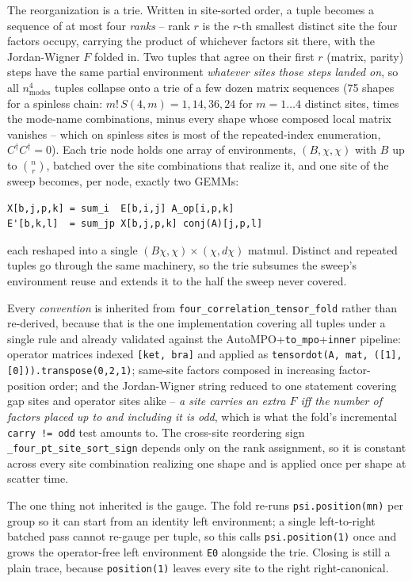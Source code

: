 \documentclass[11pt]{article}
\begin{document}
The reorganization is a trie. Written in site-sorted order, a tuple becomes a
sequence of at most four \emph{ranks} -- rank $r$ is the $r$-th smallest
distinct site the four factors occupy, carrying the product of whichever
factors sit there, with the Jordan-Wigner $F$ folded in. Two tuples that
agree on their first $r$ (matrix, parity) steps have the same partial
environment \emph{whatever sites those steps landed on}, so all
$n_\mathrm{modes}^4$ tuples collapse onto a trie of a few dozen matrix
sequences (75 shapes for a spinless chain: $m!\,S(4,m) = 1, 14, 36, 24$ for
$m = 1\ldots4$ distinct sites, times the mode-name combinations, minus every
shape whose composed local matrix vanishes -- which on spinless sites is most
of the repeated-index enumeration, $C^\dagger C^\dagger = 0$). Each trie node
holds one array of environments, $(B,\chi,\chi)$ with $B$ up to $\binom{n}{r}$,
batched over the site combinations that realize it, and one site of the sweep
becomes, per node, exactly two GEMMs:
%
\begin{verbatim}
X[b,j,p,k] = sum_i  E[b,i,j] A_op[i,p,k]
E'[b,k,l]  = sum_jp X[b,j,p,k] conj(A)[j,p,l]
\end{verbatim}
%
each reshaped into a single $(B\chi,\chi)\times(\chi,d\chi)$ matmul. Distinct
and repeated tuples go through the same machinery, so the trie subsumes the
sweep's environment reuse and extends it to the half the sweep never covered.

Every \emph{convention} is inherited from
\texttt{four\_correlation\_tensor\_fold} rather than re-derived, because that
is the one implementation covering all tuples under a single rule and already
validated against the AutoMPO+\texttt{to\_mpo}+\texttt{inner} pipeline:
operator matrices indexed \texttt{[ket, bra]} and applied as
\texttt{tensordot(A, mat, ([1],[0])).transpose(0,2,1)}; same-site factors
composed in increasing factor-position order; and the Jordan-Wigner string
reduced to one statement covering gap sites and operator sites alike --
\emph{a site carries an extra $F$ iff the number of factors placed up to and
including it is odd}, which is what the fold's incremental
\texttt{carry != odd} test amounts to. The cross-site reordering sign
\texttt{\_four\_pt\_site\_sort\_sign} depends only on the rank assignment, so
it is constant across every site combination realizing one shape and is
applied once per shape at scatter time.

The one thing not inherited is the gauge. The fold re-runs
\texttt{psi.position(mn)} per group so it can start from an identity left
environment; a single left-to-right batched pass cannot re-gauge per tuple,
so this calls \texttt{psi.position(1)} once and grows the operator-free left
environment \texttt{E0} alongside the trie. Closing is still a plain trace,
because \texttt{position(1)} leaves every site to the right right-canonical.
\end{document}
